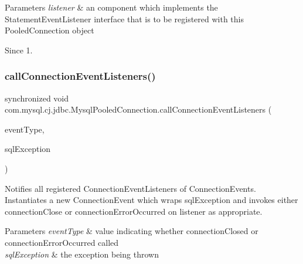 \begin{DoxyParams}{Parameters}
{\em listener} & an component which implements the {\ttfamily Statement\+Event\+Listener} interface that is to be registered with this {\ttfamily Pooled\+Connection} object\\
\hline
\end{DoxyParams}
\begin{DoxySince}{Since}
1. 
\end{DoxySince}
\mbox{\label{classcom_1_1mysql_1_1cj_1_1jdbc_1_1_mysql_pooled_connection_a6b4c7d8f141c670b4fd01246fb88d45b}} 
\subsubsection{\texorpdfstring{call\+Connection\+Event\+Listeners()}{callConnectionEventListeners()}}
{\footnotesize\ttfamily synchronized void com.\+mysql.\+cj.\+jdbc.\+Mysql\+Pooled\+Connection.\+call\+Connection\+Event\+Listeners (\begin{DoxyParamCaption}\item[{int}]{event\+Type,  }\item[{S\+Q\+L\+Exception}]{sql\+Exception }\end{DoxyParamCaption})\hspace{0.3cm}{\ttfamily [protected]}}

Notifies all registered Connection\+Event\+Listeners of Connection\+Events. Instantiates a new Connection\+Event which wraps sql\+Exception and invokes either connection\+Close or connection\+Error\+Occurred on listener as appropriate.


\begin{DoxyParams}{Parameters}
{\em event\+Type} & value indicating whether connection\+Closed or connection\+Error\+Occurred called \\
\hline
{\em sql\+Exception} & the exception being thrown \\
\hline
\end{DoxyParams}
\mbox{\label{classcom_1_1mysql_1_1cj_1_1jdbc_1_1_mysql_pooled_connection_aea456ba604e6a1a157182698ab58b2ef}} 
